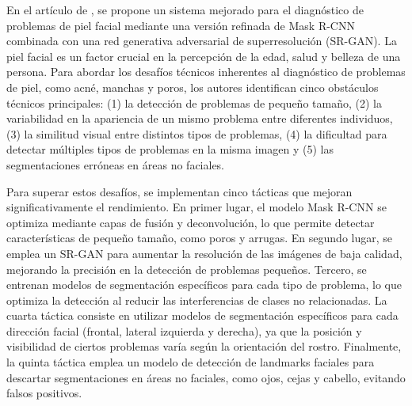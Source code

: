 

En el artículo  de \cite{Kim2023}, se propone un sistema mejorado para el diagnóstico de problemas de piel facial mediante una versión refinada de Mask R-CNN combinada con una red generativa adversarial de superresolución (SR-GAN). La piel facial es un factor crucial en la percepción de la edad, salud y belleza de una persona. Para abordar los desafíos técnicos inherentes al diagnóstico de problemas de piel, como acné, manchas y poros, los autores identifican cinco obstáculos técnicos principales: (1) la detección de problemas de pequeño tamaño, (2) la variabilidad en la apariencia de un mismo problema entre diferentes individuos, (3) la similitud visual entre distintos tipos de problemas, (4) la dificultad para detectar múltiples tipos de problemas en la misma imagen y (5) las segmentaciones erróneas en áreas no faciales.

Para superar estos desafíos, se implementan cinco tácticas que mejoran significativamente el rendimiento. En primer lugar, el modelo Mask R-CNN se optimiza mediante capas de fusión y deconvolución, lo que permite detectar características de pequeño tamaño, como poros y arrugas. En segundo lugar, se emplea un SR-GAN para aumentar la resolución de las imágenes de baja calidad, mejorando la precisión en la detección de problemas pequeños. Tercero, se entrenan modelos de segmentación específicos para cada tipo de problema, lo que optimiza la detección al reducir las interferencias de clases no relacionadas. La cuarta táctica consiste en utilizar modelos de segmentación específicos para cada dirección facial (frontal, lateral izquierda y derecha), ya que la posición y visibilidad de ciertos problemas varía según la orientación del rostro. Finalmente, la quinta táctica emplea un modelo de detección de landmarks faciales para descartar segmentaciones en áreas no faciales, como ojos, cejas y cabello, evitando falsos positivos.

